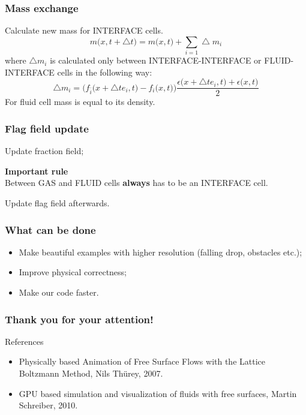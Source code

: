 \documentclass[10pt,a4paper]{beamer}
\DeclareRobustCommand{\mybox}[2][gray!20]{%
\begin{tcolorbox}[   %
        breakable,
        left=0pt,
        right=0pt,
        top=0pt,
        bottom=0pt,
        colback=#1,
        colframe=#1,
        width=\dimexpr\textwidth\relax, 
        enlarge left by=0mm,
        boxsep=5pt,
        arc=0pt,outer arc=0pt,
        ]
        #2
\end{tcolorbox}
}
\begin{document}
\begin{frame}
  \frametitle{Mass exchange}
  Calculate new mass for INTERFACE cells.
    \begin{equation}
      m\big(x, t+\bigtriangleup t\big) = m\big(x,t\big)+\sum_{i=1}\bigtriangleup m_i
    \end{equation}
    where $\bigtriangleup m_i$ is calculated only between INTERFACE-INTERFACE or
    FLUID-INTERFACE cells in the following way:
    \begin{equation}
      \bigtriangleup m_i = \Big(f_{\bar{i}}\big(x+\bigtriangleup te_i,t\big)-f_i\big(x,t\big)\Big)\frac{\epsilon\big(x+\bigtriangleup te_i,t\big)+\epsilon\big(x,t\big)}{2}
    \end{equation}
    For fluid cell mass is equal to its density.
\end{frame}

\begin{frame}
  \frametitle{Flag field update}
  Update fraction field;
  \mybox[green!20]{
    \textbf{Important rule}\\
    Between GAS and FLUID cells \textbf{always} has to be
    an INTERFACE cell.
  }
  Update flag field afterwards. 
\end{frame}
\begin{frame}
  \frametitle{What can be done}
  \begin{itemize}
  \item Make beautiful examples with higher resolution (falling drop, obstacles
    etc.);
    \item Improve physical correctness;
  \item Make our code faster.
  \end{itemize}
\end{frame}

\begin{frame}
\frametitle{Thank you for your attention!}
\end{frame}


\begin{frame}
  References
  \begin{itemize}
  \item Physically based Animation of Free Surface Flows with the Lattice
    Boltzmann Method, Nils Thürey, 2007.
  \item GPU based simulation and visualization of fluids with free surfaces, Martin Schreiber, 2010.
  \end{itemize}
\end{frame}
\end{document}
